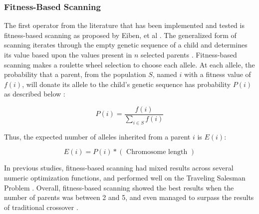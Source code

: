 \subsubsection*{Fitness-Based Scanning}
The first operator from the literature that has been implemented and tested is fitness-based scanning as proposed by Eiben, et al \cite{Eiben94}. The generalized form of scanning iterates through the empty genetic sequence of a child and determines its value based upon the values present in $n$ selected parents \cite{Eiben91}. Fitness-based scanning makes a roulette wheel selection to choose each allele. At each allele, the probability that a parent, from the population $S$, named $i$ with a fitness value of $f(i)$, will donate its allele to the child's genetic sequence has probability $P(i)$ as described below \cite{Eiben94}: 

\[ P(i) = \frac{f(i)}{\sum\limits_{i \in S} f(i)} \]

\noindent Thus, the expected number of alleles inherited from a parent $i$ is $E(i)$\cite{Eiben94}:

\[ E(i) = P(i) *(\text{ Chromosome length }) \]

In previous studies, fitness-based scanning had mixed results across several numeric optimization functions, and performed well on the Traveling Salesman Problem \cite{Eiben94, Eiben95}. Overall, fitness-based scanning showed the best results when the number of parents was between 2 and 5, and even managed to surpass the results of traditional crossover \cite{Eiben94}. 

